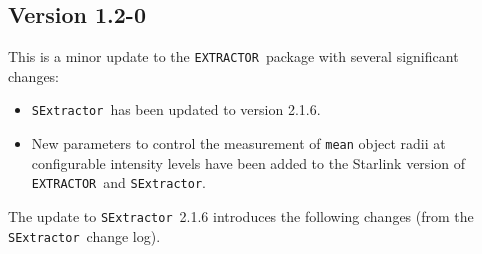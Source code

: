 \documentclass[twoside,11pt]{article}
\renewcommand{\_}{\texttt{\symbol{95}}}
\newcommand{\EXTRACTOR}{\texttt{EXTRACTOR}}
\newcommand{\SExtractor}{\texttt{SExtractor}}
\begin{document}
\subsection{Version 1.2-0}
 This is a minor update to the \EXTRACTOR\ package with several
 significant changes:
 \begin{itemize}
   \item \SExtractor\ has been updated to version 2.1.6. 

   \item New parameters to control the measurement of \texttt{mean}
         object radii at configurable intensity levels have been
         added to the Starlink version of \EXTRACTOR\ and \SExtractor.
 \end{itemize}
 The update to \SExtractor\ 2.1.6 introduces the following changes (from 
 the \SExtractor\ change log).
\end{document}
